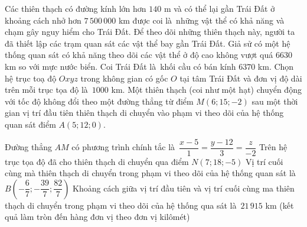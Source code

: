 \begin{ex}%
	Các thiên thạch có đường kính lớn hơn $140$ m và có thể lại gần Trái Đất ở khoảng cách nhở hơn $7\,500\,000$ km được coi là~những vật thể có khả năng và chạm gây nguy hiểm cho Trái Đất. Để theo dõi những thiên thạch này, người ta đã thiết lập các trạm quan sát các vật thể bay gần Trái Đất. Giả sử có một hệ thống quan sát có khả năng theo dõi các vật thể ở độ cao không vượt quá $6630$ km so với mực nước biển. Coi Trái Đất là~khối cầu có bán  kính $6370$ km. Chọn hệ trục toạ độ $Oxyz$ trong không gian có gốc $O$ tại tâm Trái Đất và đơn vị độ dài trên mỗi trục tọa độ là~$1000$ km. Một thiên thạch (coi như một hạt) chuyển động với tốc độ không đổi theo một đường thẳng từ điểm $M\left(6; 15; -2 \right)$ sau một thời gian vị trí đầu tiên thiên thạch di chuyển vào phạm vi theo dõi của hệ thống quan sát điểm $A\left(5; 12; 0 \right)$.
	\par 
	\choiceTF 
		{\True Đường thẳng $AM$ có phương trình chính tắc là~$\dfrac{x-5}{1} = \dfrac{y-12}{3}  = \dfrac{z}{-2}$}
		{Trên hệ trục tọa độ đã cho thiên thạch di chuyển qua điểm $N\left(7; 18; -5  \right)$}
		{\True Vị trí cuối cùng mà thiên thạch di chuyển trong phạm vi theo dõi của  hệ thống quan sát là~$B\left(-\dfrac{6}{7}; -\dfrac{39}{7}; \dfrac{82}{7} \right)$}
		{\True Khoảng cách giữa vị trí đầu tiên và vị trí cuối cùng ma thiên thạch di chuyển trong phạm vi theo dõi của hệ thống qua sát  là~$21\,915$ km (kết quả làm tròn đến hàng đơn vị theo đơn vị kilômét)}
\end{ex}

